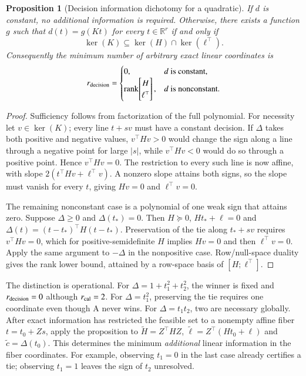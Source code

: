 \documentclass[11pt]{article}
\newtheorem{proposition}{Proposition}
\begin{document}
\begin{proposition}[Decision information dichotomy for a quadratic]
\label{prop:decisioninformation}
If $d$ is constant, no additional information is required. Otherwise, there exists a function $g$ such that $d(t)=g(Kt)$ for every $t\in\mathbb R^r$ if and only if
\[
\ker(K)\subseteq\ker(H)\cap\ker(\ell^\top).
\]
Consequently the minimum number of arbitrary exact linear coordinates is
\[
r_{\rm decision}=\begin{cases}
0,&d\ \text{is constant},\\
\operatorname{rank}\!\begin{bmatrix}H\\\ell^\top\end{bmatrix},&d\ \text{is nonconstant}.
\end{cases}
\]
\end{proposition}
\begin{proof}
Sufficiency follows from factorization of the full polynomial. For necessity let $v\in\ker(K)$; every line $t+sv$ must have a constant decision. If $\Delta$ takes both positive and negative values, $v^\top Hv>0$ would change the sign along a line through a negative point for large $|s|$, while $v^\top Hv<0$ would do so through a positive point. Hence $v^\top Hv=0$. The restriction to every such line is now affine, with slope $2(t^\top Hv+\ell^\top v)$. A nonzero slope attains both signs, so the slope must vanish for every $t$, giving $Hv=0$ and $\ell^\top v=0$.

The remaining nonconstant case is a polynomial of one weak sign that attains zero. Suppose $\Delta\ge0$ and $\Delta(t_*)=0$. Then $H\succeq0$, $Ht_*+\ell=0$ and $\Delta(t)=(t-t_*)^\top H(t-t_*)$. Preservation of the tie along $t_*+sv$ requires $v^\top Hv=0$, which for positive-semidefinite $H$ implies $Hv=0$ and then $\ell^\top v=0$. Apply the same argument to $-\Delta$ in the nonpositive case. Row/null-space duality gives the rank lower bound, attained by a row-space basis of $[H;\ell^\top]$.
\end{proof}
The distinction is operational. For $\Delta=1+t_1^2+t_2^2$, the winner is fixed and $r_{\rm decision}=0$ although $r_{\rm cal}=2$. For $\Delta=t_1^2$, preserving the tie requires one coordinate even though A never wins. For $\Delta=t_1t_2$, two are necessary globally. After exact information has restricted the feasible set to a nonempty affine fiber $t=t_0+Zs$, apply the proposition to $\widetilde H=Z^\top HZ$, $\widetilde\ell=Z^\top(Ht_0+\ell)$ and $\widetilde c=\Delta(t_0)$. This determines the minimum \emph{additional} linear information in the fiber coordinates. For example, observing $t_1=0$ in the last case already certifies a tie; observing $t_1=1$ leaves the sign of $t_2$ unresolved.
\end{document}
